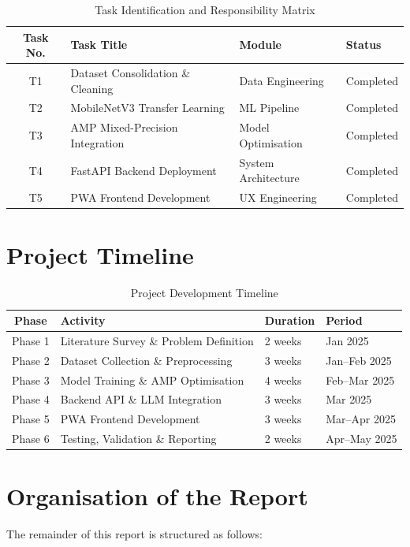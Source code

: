 \documentclass[12pt,oneside]{report}
\begin{document}
\begin{table}[H]
\centering
\caption{Task Identification and Responsibility Matrix}
\begin{tabular}{@{}clll@{}}
\toprule
\textbf{Task No.} & \textbf{Task Title} & \textbf{Module} & \textbf{Status} \\ \midrule
T1 & Dataset Consolidation \& Cleaning & Data Engineering & Completed \\
T2 & MobileNetV3 Transfer Learning & ML Pipeline & Completed \\
T3 & AMP Mixed-Precision Integration & Model Optimisation & Completed \\
T4 & FastAPI Backend Deployment & System Architecture & Completed \\
T5 & PWA Frontend Development & UX Engineering & Completed \\ \bottomrule
\end{tabular}
\end{table}

\section{Project Timeline}

\begin{table}[H]
\centering
\caption{Project Development Timeline}
\begin{tabular}{@{}clll@{}}
\toprule
\textbf{Phase} & \textbf{Activity} & \textbf{Duration} & \textbf{Period} \\ \midrule
Phase 1 & Literature Survey \& Problem Definition & 2 weeks & Jan 2025 \\
Phase 2 & Dataset Collection \& Preprocessing & 3 weeks & Jan--Feb 2025 \\
Phase 3 & Model Training \& AMP Optimisation & 4 weeks & Feb--Mar 2025 \\
Phase 4 & Backend API \& LLM Integration & 3 weeks & Mar 2025 \\
Phase 5 & PWA Frontend Development & 3 weeks & Mar--Apr 2025 \\
Phase 6 & Testing, Validation \& Reporting & 2 weeks & Apr--May 2025 \\ \bottomrule
\end{tabular}
\end{table}

\section{Organisation of the Report}
The remainder of this report is structured as follows:
\end{document}
